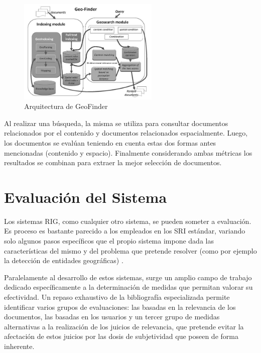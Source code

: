 \documentclass{llncs}
\begin{document}
\begin{figure}[htb]%
	\begin{center}
		\includegraphics[width=0.6\textwidth]{geofinder_arch.jpg}
	\end{center}
	\caption{Arquitectura de GeoFinder \cite{bordogna2012}}
	\label{fig:archgeofinder}
\end{figure}

Al realizar una búsqueda, la misma se utiliza para consultar documentos
relacionados por el contenido y documentos relacionados espacialmente. Luego,
los documentos se evalúan teniendo en cuenta estas dos formas antes mencionadas
(contenido y espacio). Finalmente considerando ambas métricas los
resultados se combinan para extraer la mejor selección de documentos.

\clearpage

\section{Evaluación del Sistema}\label{sec:eval}

Los sistemas RIG, como cualquier otro sistema, se pueden someter a evaluación.
Es proceso es bastante parecido a los empleados en los SRI estándar, variando
solo algunos pasos específicos que el propio sistema impone dada las
características del mismo y del problema que pretende resolver (como por
ejemplo la detección de entidades geográficas) \cite{kornai2005}.

Paralelamente al desarrollo de estos sistemas, surge un amplio campo de
trabajo dedicado específicamente a la determinación de medidas que permitan
valorar su efectividad. Un repaso exhaustivo de la bibliografía especializada
permite identificar varios grupos de evaluaciones: las basadas en la
relevancia de los documentos, las basadas en los usuarios y un tercer grupo
de medidas alternativas a la realización de los juicios de relevancia, que
pretende evitar la afectación de estos juicios por las dosis de subjetividad que
poseen de forma inherente.
\end{document}
